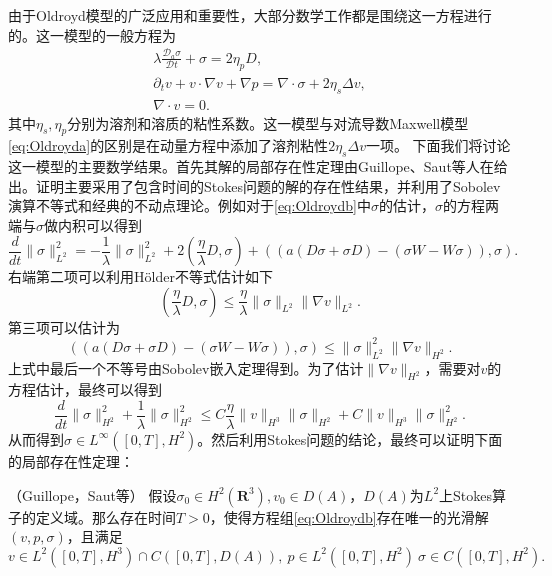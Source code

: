 由于Oldroyd模型的广泛应用和重要性，大部分数学工作都是围绕这一方程进行的。这一模型的一般方程为
\begin{subequations}\label{eq:Oldroydb}
\begin{align}
	\lambda \frac{\mathcal{D}_a \sigma}{\mathcal{D} t} + \sigma = 2 \eta_p D, \\
	\partial_t v + v \cdot \nabla v  + \nabla p = \nabla \cdot \sigma + 2 \eta_s \Delta v, \\
	\nabla \cdot v = 0.
\end{align}
\end{subequations}
其中$\eta_s,\eta_p$分别为溶剂和溶质的粘性系数。这一模型与对流导数Maxwell模型\eqref{eq:Oldroyda}的区别是在动量方程中添加了溶剂粘性$2\eta_s \Delta v$一项。
下面我们将讨论这一模型的主要数学结果。首先其解的局部存在性定理由Guillope、Saut等人在\cite{guillope1990existence}给出。证明主要采用了包含时间的Stokes问题的解的存在性结果\cite{temam1995navier}，并利用了Sobolev演算不等式\cite{majda2012compressible}和经典的不动点理论。例如对于\eqref{eq:Oldroydb}中$\sigma$的估计，$\sigma$的方程两端与$\sigma$做内积可以得到
\begin{equation*}
	\frac{d}{dt} \|\sigma\|_{L^2}^2  =  -\frac{1}{\lambda} \|\sigma\|_{L^2}^2 + 2 (\frac{\eta}{\lambda} D, \sigma) + \left( (a(D \sigma + \sigma D) - (\sigma W -W \sigma)),\sigma \right).
\end{equation*}
右端第二项可以利用H\"older不等式估计如下
\begin{equation*}
	(\frac{\eta}{\lambda} D, \sigma) \le \frac{\eta}{\lambda} \|\sigma\|_{L^2} \|\nabla v\|_{L^2}.
\end{equation*}
第三项可以估计为
\begin{equation*}
	 \left( (a(D \sigma + \sigma D) - (\sigma W -W \sigma)),\sigma \right) 
\le \|\sigma\|^2_{L^2} \|\nabla v\|_{H^2}
.
\end{equation*}
上式中最后一个不等号由Sobolev嵌入定理得到。为了估计$\|\nabla v\|_{H^2}$，需要对$v$的方程估计，最终可以得到\cite{guillope1990existence}
\begin{equation*}
		\frac{d}{dt} \|\sigma\|_{H^2}^2 + \frac{1}{\lambda} \|\sigma\|_{H^2}^2 \le C \frac{\eta}{\lambda} \|v\|_{H^3} \|\sigma\|_{H^2} + C \|v\|_{H^3} \|\sigma\|_{H^2}^2.
\end{equation*}
从而得到$\sigma \in L^\infty([0,T],H^2)$。然后利用Stokes问题的结论，最终可以证明下面的局部存在性定理：
\begin{theorem}（Guillope，Saut等\cite{guillope1990existence,saut2012lectures}）
	假设$\sigma_0 \in H^2(\mathbf{R}^3),v_0 \in D(A)$，$D(A)$为$L^2$上Stokes算子的定义域。那么存在时间$T>0$，使得方程组\eqref{eq:Oldroydb}存在唯一的光滑解$(v,p,\sigma)$，且满足
	\begin{equation*}
		v \in L^2([0,T],H^3) \cap C([0,T],D(A)), \ p \in L^2([0,T],H^2) \ \sigma \in C([0,T],H^2).
	\end{equation*}
\end{theorem}
